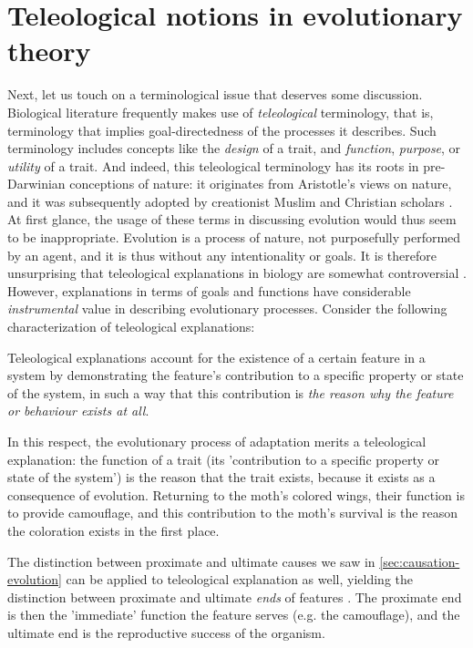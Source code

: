 \section{Teleological notions in evolutionary theory}
\label{sec:teleology}
Next, let us touch on a terminological issue that deserves some discussion.
Biological literature frequently makes use of \emph{teleological} terminology, that is, terminology that implies goal-directedness of the processes it describes. Such terminology includes concepts like the \emph{design} of a trait, and \emph{function}, \emph{purpose}, or \emph{utility} of a trait.
And indeed, this teleological terminology has its roots in pre-Darwinian conceptions of nature: it originates from Aristotle's views on nature, and it was subsequently adopted by creationist Muslim and Christian scholars \citep{Johnson05}.
At first glance, the usage of these terms in discussing evolution would thus seem to be inappropriate. Evolution is a process of nature, not purposefully performed by an agent, and it is thus without any intentionality or goals.
It is therefore unsurprising that teleological explanations in biology are somewhat controversial \citep[see][p.~27 for discussion]{Ayala99}.
However, explanations in terms of goals and functions have considerable \emph{instrumental} value in describing evolutionary processes. Consider the following characterization of teleological explanations:
\begin{quoting}
    Teleological explanations account for the existence of a certain feature in a system by demonstrating the feature’s contribution to a specific property or state of the system, in such a way that this contribution is \emph{the reason why the feature or behaviour exists at all}.
    \hfill \citep[p.~13]{Ayala99}
\end{quoting}
In this respect, the evolutionary process of adaptation merits a teleological explanation: the function of a trait (its 'contribution to a specific property or state of the system') is the reason that the trait exists, because it exists as a consequence of evolution. Returning to the moth's colored wings, their function is to provide camouflage, and this contribution to the moth's survival is the reason the coloration exists in the first place.

The distinction between proximate and ultimate causes we saw in \cref{sec:causation-evolution} can be applied to teleological explanation as well, yielding the distinction between proximate and ultimate \emph{ends} of features \citep[p.~18]{Ayala99}. The proximate end is then the 'immediate' function the feature serves (e.g. the camouflage), and the ultimate end is the reproductive success of the organism.

